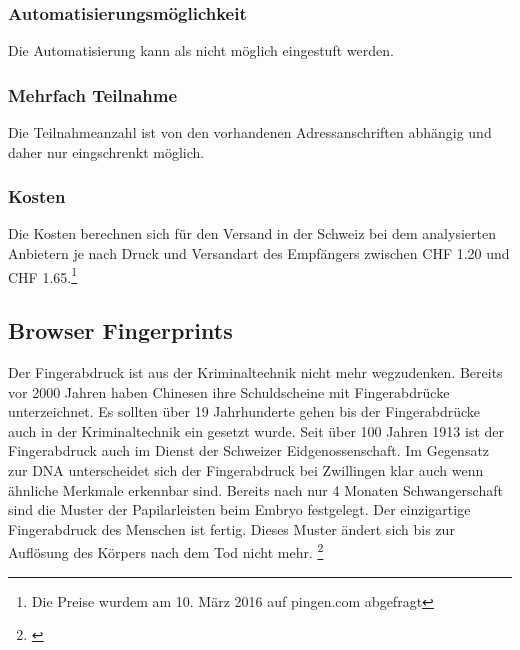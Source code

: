 \subsubsection{Automatisierungsmöglichkeit}\label{automatisierungsmuxf6glichkeit-3}

Die Automatisierung kann als nicht möglich eingestuft werden.

\subsubsection{Mehrfach Teilnahme}\label{mehrfach-teilnahme-3}

Die Teilnahmeanzahl ist von den vorhandenen Adressanschriften abhängig
und daher nur eingschrenkt möglich.

\subsubsection{Kosten}\label{kosten-3}

Die Kosten berechnen sich für den Versand in der Schweiz bei dem
analysierten Anbietern je nach Druck und Versandart des Empfängers
zwischen CHF 1.20 und CHF 1.65.\footnote{Die Preise wurdem am 10. März
  2016 auf pingen.com abgefragt}

\subsection{Browser Fingerprints}\label{browser-fingerprints}

Der Fingerabdruck ist aus der Kriminaltechnik nicht mehr wegzudenken.
Bereits vor 2000 Jahren haben Chinesen ihre Schuldscheine mit
Fingerabdrücke unterzeichnet. Es sollten über 19 Jahrhunderte gehen bis
der Fingerabdrücke auch in der Kriminaltechnik ein gesetzt wurde. Seit
über 100 Jahren 1913 ist der Fingerabdruck auch im Dienst der Schweizer
Eidgenossenschaft. Im Gegensatz zur DNA unterscheidet sich der
Fingerabdruck bei Zwillingen klar auch wenn ähnliche Merkmale erkennbar
sind. Bereits nach nur 4 Monaten Schwangerschaft sind die Muster der
Papilarleisten beim Embryo festgelegt. Der einzigartige Fingerabdruck
des Menschen ist fertig. Dieses Muster ändert sich bis zur Auflösung des
Körpers nach dem Tod nicht mehr. \footnote{\autocite{derfingerabdruck}}

